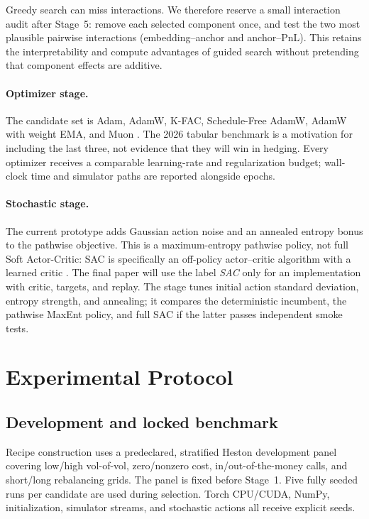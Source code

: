 \documentclass[sigconf,balance=false]{acmart}
\begin{document}
Greedy search can miss interactions.  We therefore reserve a small
interaction audit after Stage~5: remove each selected component once, and test
the two most plausible pairwise interactions (embedding--anchor and
anchor--PnL).  This retains the interpretability and compute advantages of
guided search without pretending that component effects are additive.

\paragraph{Optimizer stage.}
The candidate set is Adam, AdamW, K-FAC, Schedule-Free AdamW, AdamW with
weight EMA, and Muon \cite{jordan2024muon}.  The 2026 tabular benchmark is a
motivation for including the last three, not evidence that they will win in
hedging.  Every optimizer
receives a comparable learning-rate and regularization budget; wall-clock time
and simulator paths are reported alongside epochs.

\paragraph{Stochastic stage.}
The current prototype adds Gaussian action noise and an annealed entropy bonus
to the pathwise objective.  This is a maximum-entropy pathwise policy, not full
Soft Actor-Critic: SAC is specifically an off-policy actor--critic algorithm
with a learned critic \cite{haarnoja2018sac}.  The final paper will use the label
\emph{SAC} only for an implementation with critic, targets, and replay.  The
stage tunes initial action standard deviation, entropy strength, and annealing;
it compares the deterministic incumbent, the pathwise MaxEnt policy, and full
SAC if the latter passes independent smoke tests.

\section{Experimental Protocol}
\label{sec:protocol}

\subsection{Development and locked benchmark}

Recipe construction uses a predeclared, stratified Heston development panel
covering low/high vol-of-vol, zero/nonzero cost, in/out-of-the-money calls, and
short/long rebalancing grids.  The panel is fixed before Stage~1.  Five fully
seeded runs per candidate are used during selection.  Torch CPU/CUDA, NumPy,
initialization, simulator streams, and stochastic actions all receive explicit
seeds.
\end{document}
